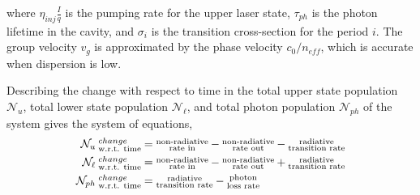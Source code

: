 \documentclass[12pt]{report}
\begin{document}
where $\eta_\textit{inj}\frac{I}{q}$ is the pumping rate for the upper laser state, $\tau_{ph}$ is the photon lifetime in the cavity, and $\sigma_i$ is the transition cross-section for the period $i$.  The group velocity $v_g$ is approximated by the phase velocity $c_0/n_\textit{eff}$, which is accurate when dispersion is low.










Describing the change with respect to time in the total upper state population $\mathcal{N}_u$, total lower state population $\mathcal{N}_\ell$, and total photon population $\mathcal{N}_{ph}$ of the system gives the system of equations,
\begin{subequations}
\begin{align}
\mathcal{N}_u\: \begin{subarray} \tn{change}\\\tn{w.r.t. time}\end{subarray} &= \begin{subarray}{c}\tn{non-radiative}\\\tn{rate in}\end{subarray} - \begin{subarray}{c}\tn{non-radiative}\\\tn{rate out}\end{subarray} - \begin{subarray}{c}\tn{radiative}\\\tn{transition rate}\end{subarray}\\
\mathcal{N}_\ell\: \begin{subarray} \tn{change}\\\tn{w.r.t. time}\end{subarray} &= \begin{subarray}{c}\tn{non-radiative}\\\tn{rate in}\end{subarray} - \begin{subarray}{c}\tn{non-radiative}\\\tn{rate out}\end{subarray} + \begin{subarray}{c}\tn{radiative}\\\tn{transition rate}\end{subarray}\\
\mathcal{N}_{ph}\: \begin{subarray} \tn{change}\\\tn{w.r.t. time}\end{subarray} &= \begin{subarray}{c}\tn{radiative}\\\tn{transition rate}\end{subarray} - \begin{subarray}{c}\tn{photon}\\\tn{loss rate}\end{subarray}
\end{align}
\end{subequations}
\end{document}
